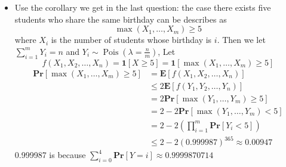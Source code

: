 \documentclass{article}
\theoremstyle{definition}
\begin{document}
\begin{itemize}
		$\sum_{k=1}^n Y_k \sim Poisson(m\lambda)$, $\sum_{j=\lambda}^{\infty}\mathbf{Pr}[\sum_{k=1}^n Y_k = j]\geq \frac{1}{2}$
		\begin{equation}
			2 \mathbf{E}\left[f\left(Y_1, Y_2, \ldots, Y_n\right)\right] \geq \mathbf{E}\left[f\left(X_1, X_2, \ldots, X_n\right)\right].
		\end{equation}
		\item Use the corollary we get in the last question: the case there exists five students who share the same birthday can be describes as 
		\begin{equation}
			\max(X_1, \dots,  X_m) \geq 5
		\end{equation}
		where $X_i$ is the number of students whose birthday is $i$. Then we let $\sum_{i=1}^m Y_i = n$ and $Y_i\sim \operatorname{Pois}(\lambda=\frac{n}{m})$, 
		Let
		\begin{equation}
			f\left(X_1, X_2, \ldots, X_n\right) = \mathbf1 [ X \geq 5] = \mathbf1[\max(X_1, \dots,  X_m) \geq 5]
		\end{equation}
		\begin{equation}
			\begin{aligned}
				\mathbf{Pr}[\max(X_1, \dots,  X_m) \geq 5] & = \mathbf{E}\left[f\left(X_1, X_2, \ldots, X_n\right)\right] \\
				& \leq 2 \mathbf{E}\left[f\left(Y_1, Y_2, \ldots, Y_n\right)\right]\\
				& = 2\mathbf{Pr}[\max(Y_1, \dots,  Y_m) \geq 5] \\
				& = 2-2\mathbf{Pr}[\max(Y_1, \dots,  Y_m) < 5] \\
				& = 2-2(\prod_{i=1}^m\mathbf{Pr}[Y_i<5]) \\
				& \leq 2-2(0.999987)^{365} \approx 0.00947
			\end{aligned}		
		\end{equation}
		0.999987 is because $\sum_{i=0}^4\mathbf{Pr}[Y=i]\approx0.9999870714$
		
	\end{itemize}
\end{document}
